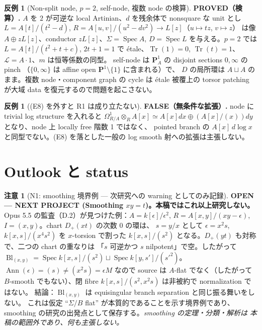 \documentclass[11pt,a4paper]{article}
\numberwithin{equation}{section}
\theoremstyle{definition}
\newtheorem{counterexample}[definition]{反例}
\newtheorem{remark}[definition]{注意}
\DeclareMathOperator{\Tr}{Tr}
\DeclareMathOperator{\Bl}{Bl}
\newcommand{\LL}{\mathcal L}
\begin{document}
\begin{counterexample}[Non-split node, $p=2$, self-node, 複数 node の検算]
\textbf{PROVED（検算）.}
$A$ を $2$ が可逆な local Artinian、$d$ を残余体で nonsquare な unit とし
$L=A[t]/(t^2-d)$, $R=A[u,v]/(u^2-dv^2)\to L[z]$（$u\mapsto tz$, $v\mapsto z$）
は像 $A\oplus zL[z]$、conductor $zL[z]$、$\Sigma=\operatorname{Spec}A$,
$D=\operatorname{Spec}L$ を与える。$p=2$ では $L=A[t]/(t^2+t+c)$, $2t+1=1$ で
étale、$\Tr(1)=0$, $\Tr(t)=1$、$\LL=A\cdot1$、$m$ は恒等係数の同型。
self-node は $\mathbf P^1_A$ の disjoint sections $0,\infty$ の pinch
（$\{0,\infty\}$ は affine open $\mathbf P^1\setminus\{1\}$ に含まれる）で、
$D$ の局所環は $A\sqcup A$ のまま。複数 node・component graph の cycle は
étale 被覆上の torsor patching が大域 data を復元するので問題を起こさない。
\end{counterexample}

\begin{counterexample}[(E8) を外すと R1 は成り立たない]\label{cex:E8}
\textbf{FALSE（無条件な拡張）.}
node に trivial log structure を入れると $\Omega^1_{R/A}\otimes_RA[x]\simeq
A[x]dx\oplus(A[x]/(x))dy$ となり、node 上 locally free 階数 1 ではなく、
pointed branch の $A[x]\,d\log x$ と同型でない。(E8) を落とした一般の
log smooth 射への拡張は主張しない。
\end{counterexample}

\section{Outlook と status}\label{sec:outlook}

\begin{remark}[N1: smoothing 境界例 --- 次研究への warning としてのみ記録]
\label{rem:N1}
\textbf{OPEN --- NEXT PROJECT (Smoothing $xy=t$)。本稿ではこれ以上研究しない。}
Opus 5.5 の監査（D.2）が見つけた例：$A=k[\epsilon]/\epsilon^2$,
$R=A[x,y]/(xy-\epsilon)$, $I=(x,y)$。chart $D_+(xt)$ の次数 $0$ の環は、
$s=y/x$ として $\epsilon=x^2s$, $k[x,s]/(x^4s^2)$ を $x$-torsion で割った
$k[x,s]/(s^2)$ となる。$D_+(yt)$ も対称で、二つの chart の重なりは
「$s$ 可逆かつ $s$ nilpotent」で空。したがって
$\Bl_{(x,y)}=\operatorname{Spec}k[x,s]/(s^2)\sqcup\operatorname{Spec}k[y,s']/(s'^2)$。
$\operatorname{Ann}(\epsilon)=(s)\ne(x^2s)=\epsilon M$ なので source は
$A$-flat でなく（したがって $B$-smooth でもない）、閉 fibre
$k[x,s]/(s^2,x^2s)$ は非被約で normalization ではない。
結論：$\Bl_{(x,y)}$ は equisingular branch separation と同じ振る舞いをしない。
これは仮定 ``$\Sigma/B$ flat'' が本質的であることを示す境界例であり、
smoothing の研究の出発点として保存する。\emph{smoothing の定理・分類・解析は
本稿の範囲外であり、何も主張しない。}
\end{remark}
\end{document}
